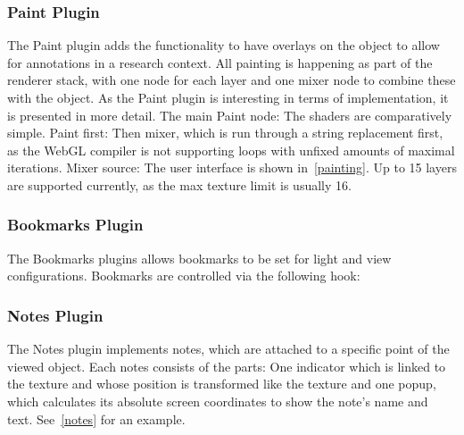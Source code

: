 \subsubsection{Paint Plugin}
The Paint plugin adds the functionality to have overlays on the object to allow
for annotations in a research context. All painting is happening as part of the
renderer stack, with one node for each layer and one mixer node to combine these
with the object. As the Paint plugin is interesting in terms of implementation, it is
presented in more detail. The main Paint node:
The shaders are comparatively simple. Paint first:
Then mixer, which is run through a string replacement first, as the WebGL
compiler is not supporting loops with unfixed amounts of maximal iterations.
Mixer source:
The user interface is shown in~\autoref{painting}. Up to 15 layers are supported
currently, as the max texture limit is usually 16.

\subsubsection{Bookmarks Plugin}
The Bookmarks plugins allows bookmarks to be set for light and view
configurations. Bookmarks are controlled via the following hook:

\subsubsection{Notes Plugin}
The Notes plugin implements notes, which are attached to a specific point of the
viewed object. Each notes consists of the parts: One indicator which is linked
to the texture and whose position is transformed like the texture and one popup,
which calculates its absolute screen coordinates to show the note's name and
text. See~\autoref{notes} for an example.

